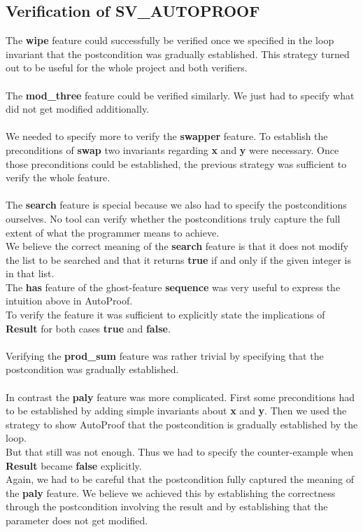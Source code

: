 \documentclass{report}
\begin{document}
\subsection{Verification of SV\_AUTOPROOF}

The \textbf{wipe} feature could successfully be verified once we specified in the loop
invariant that the postcondition was gradually established. This strategy
turned out to be useful for the whole project and both verifiers.
\\
\\
The \textbf{mod\_three} feature could be verified similarly. We just had to
specify what did not get modified additionally.
\\
\\
We needed to specify more to verify the \textbf{swapper} feature. To establish
the preconditions of \textbf{swap} two invariants regarding \textbf{x} and
\textbf{y} were necessary. Once those preconditions could be established, the
previous strategy was sufficient to verify the whole feature.
\\
\\
The \textbf{search} feature is special because we also had to specify the 
postconditions ourselves. No tool can verify whether the postconditions truly
capture the full extent of what the programmer means to achieve.\\
We believe the correct meaning of the \textbf{search} feature is that it does
not modify the list to be searched and that it returns \textbf{true} if and only if
the given integer is in that list.\\
The \textbf{has} feature of the ghost-feature \textbf{sequence} was very useful
to express the intuition above in AutoProof.\\
To verify the feature it was sufficient to explicitly state the implications
of \textbf{Result} for both cases \textbf{true} and \textbf{false}.
\\
\\
Verifying the \textbf{prod\_sum} feature was rather trivial by specifying that
the postcondition was gradually established.
\\
\\
In contrast the \textbf{paly} feature was more complicated. First some preconditions
had to be established by adding simple invariants about \textbf{x} and \textbf{y}.
Then we used the strategy to show AutoProof that the postcondition is gradually
established by the loop.\\
But that still was not enough. Thus we had to specify the counter-example
when \textbf{Result} became \textbf{false} explicitly.\\
Again, we had to be careful that the postcondition fully captured the meaning
of the \textbf{paly} feature. We believe we achieved this by establishing the
correctness through the postcondition involving the result and by establishing
that the parameter does not get modified.
\end{document}
